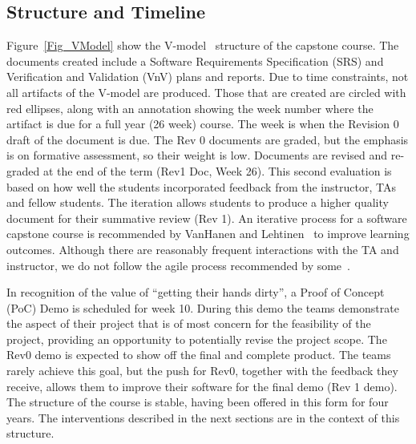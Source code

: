\documentclass[10pt, conference]{IEEEtran}
\begin{document}
\subsection{Structure and Timeline} \label{Sec_Structure}

Figure~\ref{Fig_VModel} show the V-model~\cite{ForsbergAndMooz1991} structure of
the capstone course. The documents created include a Software Requirements
Specification (SRS) and Verification and Validation (VnV) plans and reports. Due
to time constraints, not all artifacts of the V-model are produced.  Those that
are created are circled with red ellipses, along with an annotation showing the
week number where the artifact is due for a full year (26 week) course.  The
week is when the Revision 0 draft of the document is due.  The Rev 0 documents
are graded, but the emphasis is on formative assessment, so their weight is low.
Documents are revised and re-graded at the end of the term (Rev1 Doc, Week 26).
This second evaluation is based on how well the students incorporated feedback
from the instructor, TAs and fellow students. The iteration allows students to
produce a higher quality document for their summative review (Rev 1). An
iterative process for a software capstone course is recommended by VanHanen and
Lehtinen~\cite{vanhanenSoftwareEngineeringProblems2014} to improve learning
outcomes. Although there are reasonably frequent interactions with the TA and
instructor, we do not follow the agile process recommended by
some~\cite{stettinaAcademicEducationSoftware2013,
bastarricaWhatCanStudents2017}.

In recognition of the value of ``getting their hands dirty'', a Proof of Concept
(PoC) Demo is scheduled for week 10. During this demo the teams demonstrate the
aspect of their project that is of most concern for the feasibility of the
project, providing an opportunity to potentially revise the project scope. The
Rev0 demo is expected to show off the final and complete product. The teams
rarely achieve this goal, but the push for Rev0, together with the feedback they
receive, allows them to improve their software for the final demo (Rev 1 demo).
The structure of the course is stable, having been offered in this form for four
years. The interventions described in the next sections are in the context of
this structure. 
\end{document}

